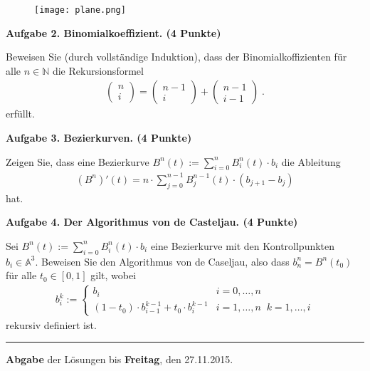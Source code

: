 \documentclass[a4paper,12pt]{scrartcl}
\begin{document}
\begin{figure}[H]
    \centering
    \texttt{[image: plane.png]}
    
\end{figure}

\vspace*{4mm}




{\bf Aufgabe 2. Binomialkoeffizient. \hfill (4 Punkte)}

Beweisen Sie (durch vollständige Induktion), dass  der Binomialkoffizienten für alle $n \in \mathbb{N}$ die Rekursionsformel  
\begin{align*}
\begin{pmatrix} n \\ i \end{pmatrix} = \begin{pmatrix} n-1 \\ i \end{pmatrix} + \begin{pmatrix} n-1 \\ i-1 \end{pmatrix}  \; .
\end{align*}
erfüllt.
\vspace*{8mm}


\newpage 

{\bf Aufgabe 3. Bezierkurven. \hfill (4 Punkte)}

Zeigen Sie, dass eine Bezierkurve   $B^n(t) := \sum_{i = 0}^{n} B_i^n(t) \cdot  b_i$  die Ableitung
\begin{align*}
(B^n)'(t) = n \cdot \sum_{j = 0}^{n-1} B_{j}^{n-1}(t) \cdot (b_{j+1} - b_j) 
\end{align*}
 hat.


\vspace*{4mm}

{\bf Aufgabe 4.  Der Algorithmus von de Casteljau. \hfill (4 Punkte)}

Sei $B^n(t) := \sum_{i = 0}^{n} B_i^n(t) \cdot  b_i$ eine Bezierkurve mit den Kontrollpunkten $b_i \in \mathbb{A}^3$.
Beweisen Sie den Algorithmus von de Caseljau, also dass
 $b_n^n = B^n(t_0)$ für alle $t_0 \in [0,1]$ gilt, wobei
\begin{align*}
b_i^k := \begin{cases}
b_i   & i= 0, \hdots,  n \\
(1-t_0) \cdot b_{i-1}^{k-1} + t_0 \cdot b_{i}^{k-1} &  i = 1, \hdots , n \; \;   k = 1, \hdots , i 
\end{cases} 
\end{align*}
rekursiv definiert ist.

 





\vfill

\hrule
{\bf Abgabe} der L\"osungen  bis  {\bf Freitag}, den 27.11.2015.  
\end{document}

